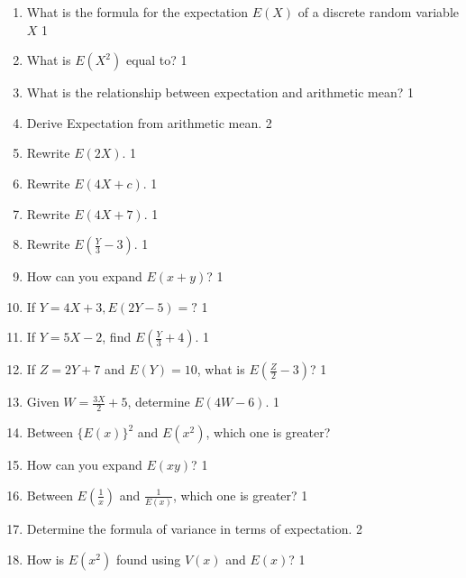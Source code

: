 \documentclass[a4paper,oneside, margin=1.4in]{book}
\begin{document}
\begin{enumerate}



\item What is the formula for the expectation \( E(X) \) of a discrete random variable \( X \) \hfill 1

\item What is $E(X^2)$ equal to? \hfill 1

\item What is the relationship between expectation and arithmetic mean?  \hfill 1

\item Derive Expectation from arithmetic mean.  \hfill 2

\item Rewrite $E(2X)$.  \hfill 1

\item Rewrite $E(4X + c)$.  \hfill 1

\item Rewrite $E(4X + 7)$.  \hfill 1

\item Rewrite $E(\frac Y3 - 3)$.  \hfill 1

\item How can you expand $E(x+y)$? \hfill 1

\item If $Y = 4X + 3, E(2Y-5)=?$ \hfill 1

\item If $Y = 5X - 2$, find $E\left(\frac{Y}{3} + 4\right)$. \hfill 1

\item If $Z = 2Y + 7$ and $E(Y) = 10$, what is $E\left(\frac{Z}{2} - 3\right)$? \hfill 1

\item Given $W = \frac{3X}{2} + 5$, determine $E(4W - 6)$. \hfill 1

\item Between $\{E(x)\}^2$ and $E(x^2)$, which one is greater?

\item How can you expand $E(xy)$? \hfill 1

\item Between $\displaystyle E\left(\frac{1}{x}\right)$ and $\displaystyle \frac 1{E(x)}$, which one is greater? \hfill 1

 \item Determine the formula of variance in terms of expectation. \hfill 2

\item How is \( E(x^2) \) found using \( V(x) \) and \( E(x) \)? \hfill 1


\end{enumerate}
\end{document}
